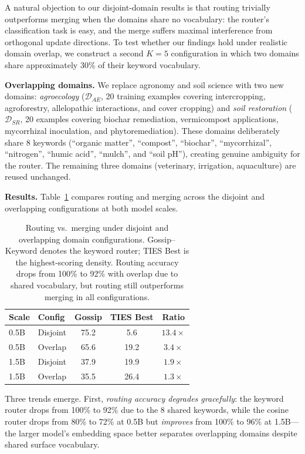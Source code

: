 \documentclass[conference, 10pt]{IEEEtran}
\begin{document}
A natural objection to our disjoint-domain results is that routing
trivially outperforms merging when the domains share no vocabulary:
the router's classification task is easy, and the merge suffers maximal
interference from orthogonal update directions. To test whether our
findings hold under realistic domain overlap, we construct a second
$K=5$ configuration in which two domains share approximately 30\% of
their keyword vocabulary.

\textbf{Overlapping domains.}
We replace agronomy and soil science with two new domains:
\emph{agroecology} ($\mathcal{D}_{AE}$, 20 training examples covering
intercropping, agroforestry, allelopathic interactions, and cover
cropping) and \emph{soil restoration} ($\mathcal{D}_{SR}$, 20 examples
covering biochar remediation, vermicompost applications, mycorrhizal
inoculation, and phytoremediation). These domains deliberately share
8 keywords (``organic matter'', ``compost'', ``biochar'',
``mycorrhizal'', ``nitrogen'', ``humic acid'', ``mulch'', and
``soil pH''), creating genuine ambiguity for the router.
The remaining three domains (veterinary, irrigation, aquaculture)
are reused unchanged.

\textbf{Results.}
Table~\ref{tab:overlap-summary} compares routing and merging across
the disjoint and overlapping configurations at both model scales.

\begin{table}[htbp]
\centering
\caption{Routing vs.\ merging under disjoint and overlapping domain
configurations. Gossip--Keyword denotes the keyword router; TIES Best
is the highest-scoring density. Routing accuracy drops from 100\% to
92\% with overlap due to shared vocabulary, but routing still
outperforms merging in all configurations.}
\label{tab:overlap-summary}
\begin{tabular}{l l c c c}
\toprule
\textbf{Scale} & \textbf{Config} & \textbf{Gossip} & \textbf{TIES Best}
  & \textbf{Ratio} \\
\midrule
0.5B & Disjoint & 75.2 &  5.6 & $13.4\times$ \\
0.5B & Overlap  & 65.6 & 19.2 & $3.4\times$ \\
\midrule
1.5B & Disjoint & 37.9 & 19.9 & $1.9\times$ \\
1.5B & Overlap  & 35.5 & 26.4 & $1.3\times$ \\
\bottomrule
\end{tabular}
\end{table}

Three trends emerge. First, \emph{routing accuracy degrades gracefully}:
the keyword router drops from 100\% to 92\% due to the 8 shared
keywords, while the cosine router drops from 80\% to 72\% at 0.5B but
\emph{improves} from 100\% to 96\% at 1.5B---the larger model's
embedding space better separates overlapping domains despite shared
surface vocabulary.
\end{document}
